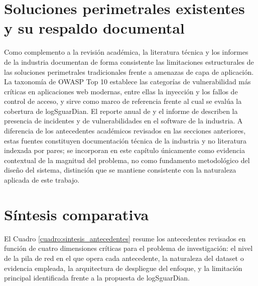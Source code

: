 \section{Soluciones perimetrales existentes y su respaldo documental}

Como complemento a la revisión académica, la literatura técnica y los informes de la industria documentan de forma consistente las limitaciones estructurales de las soluciones perimetrales tradicionales frente a amenazas de capa de aplicación. La taxonomía de OWASP Top 10 \cite{owasp2021} establece las categorías de vulnerabilidad más críticas en aplicaciones web modernas, entre ellas la inyección y los fallos de control de acceso, y sirve como marco de referencia frente al cual se evalúa la cobertura de logSguarDian. El reporte anual de \textcite{verizon2024} y el informe de \textcite{snyk2024} describen la presencia de incidentes y de vulnerabilidades en el software de la industria. A diferencia de los antecedentes académicos revisados en las secciones anteriores, estas fuentes constituyen documentación técnica de la industria y no literatura indexada por pares; se incorporan en este capítulo únicamente como evidencia contextual de la magnitud del problema, no como fundamento metodológico del diseño del sistema, distinción que se mantiene consistente con la naturaleza aplicada de este trabajo.

\section{Síntesis comparativa}

El Cuadro \ref{cuadro:sintesis_antecedentes} resume los antecedentes revisados en función de cuatro dimensiones críticas para el problema de investigación: el nivel de la pila de red en el que opera cada antecedente, la naturaleza del dataset o evidencia empleada, la arquitectura de despliegue del enfoque, y la limitación principal identificada frente a la propuesta de logSguarDian.

